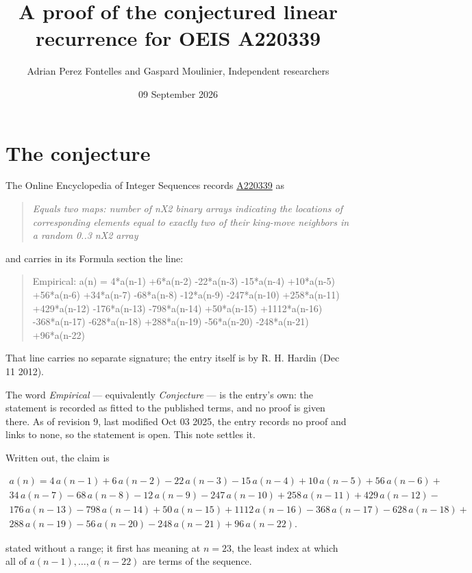 \documentclass[11pt]{article}
\title{A proof of the conjectured linear recurrence for OEIS A220339}
\author{Adrian Perez Fontelles and Gaspard Moulinier, Independent researchers}
\date{09 September 2026}
\theoremstyle{definition}
\begin{document}
\maketitle
\section{The conjecture}

The Online Encyclopedia of Integer Sequences records \href{https://oeis.org/A220339}{A220339} as

\begin{quote}\itshape Equals two maps: number of nX2 binary arrays indicating the locations of corresponding elements equal to exactly two of their king-move neighbors in a random 0..3 nX2 array\end{quote}

and carries in its Formula section the line:

\begin{quote}\ttfamily Empirical: a(n) = 4*a(n-1) +6*a(n-2) -22*a(n-3) -15*a(n-4) +10*a(n-5) +56*a(n-6) +34*a(n-7) -68*a(n-8) -12*a(n-9) -247*a(n-10) +258*a(n-11) +429*a(n-12) -176*a(n-13) -798*a(n-14) +50*a(n-15) +1112*a(n-16) -368*a(n-17) -628*a(n-18) +288*a(n-19) -56*a(n-20) -248*a(n-21) +96*a(n-22)\end{quote}

That line carries no separate signature; the entry itself is by R. H. Hardin (Dec 11 2012).

The word {\itshape Empirical} --- equivalently {\itshape Conjecture} --- is the entry's own: the statement is recorded as fitted to the published terms, and no proof is given there. As of revision 9, last modified Oct 03 2025, the entry records no proof and links to none, so the statement is open. This note settles it.

Written out, the claim is

\begin{multline*} a(n) = 4\,a(n-1) + 6\,a(n-2) - 22\,a(n-3) - 15\,a(n-4) + 10\,a(n-5) + 56\,a(n-6) + \\ 34\,a(n-7) - 68\,a(n-8) - 12\,a(n-9) - 247\,a(n-10) + 258\,a(n-11) + 429\,a(n-12) - \\ 176\,a(n-13) - 798\,a(n-14) + 50\,a(n-15) + 1112\,a(n-16) - 368\,a(n-17) - 628\,a(n-18) + \\ 288\,a(n-19) - 56\,a(n-20) - 248\,a(n-21) + 96\,a(n-22). \end{multline*}

stated without a range; it first has meaning at $n = 23$, the least index at which all of $a(n-1),\dots,a(n-22)$ are terms of the sequence.
\end{document}
